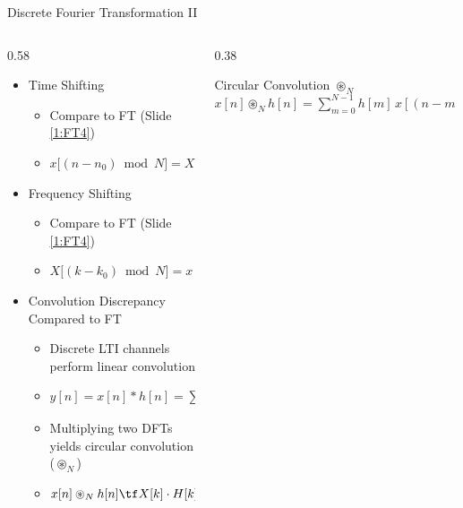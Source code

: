\begin{frame}{Discrete Fourier Transformation II}
\begin{columns}[T,onlytextwidth]
    \begin{column}{0.58\textwidth}
        \vspace{0.8em}
        \begin{itemize}
            \item Time Shifting
                \begin{itemize}
                    \item Compare to FT (Slide \ref{1:FT4})
                    \item $x\big[(n - n_0) \bmod N\big]= X[k] \, e^{-j \frac{2\pi}{N} k n_0}$
                \end{itemize}
            \item Frequency Shifting
                \begin{itemize}
                    \item Compare to FT (Slide \ref{1:FT4})
                    \item $X\big[(k - k_0) \bmod N\big] = x[n] \, e^{j \frac{2\pi}{N} k_0 n}$
                \end{itemize}
            \item Convolution Discrepancy Compared to FT
                \begin{itemize}
                    \item Discrete LTI channels perform linear convolution
                    \item $y[n] = x[n] * h[n] = \sum_m h[m] x[n - m]$
                    \item Multiplying two DFTs yields circular convolution ($\circledast_N$)
                    \item$x[n] \circledast_N h[n] \tf X[k] \cdot H[k]$ \\[0.2cm]
                \end{itemize}
        \end{itemize}
    \end{column}
    \begin{column}{0.38\textwidth}
        \begin{block}{Circular Convolution $\circledast_N$}
            \centering
            $x[n] \circledast_N h[n] = \sum_{m=0}^{N-1} h[m] \, x[(n - m) \bmod N]$
        \end{block}
    \end{column}
\end{columns}
\end{frame}

